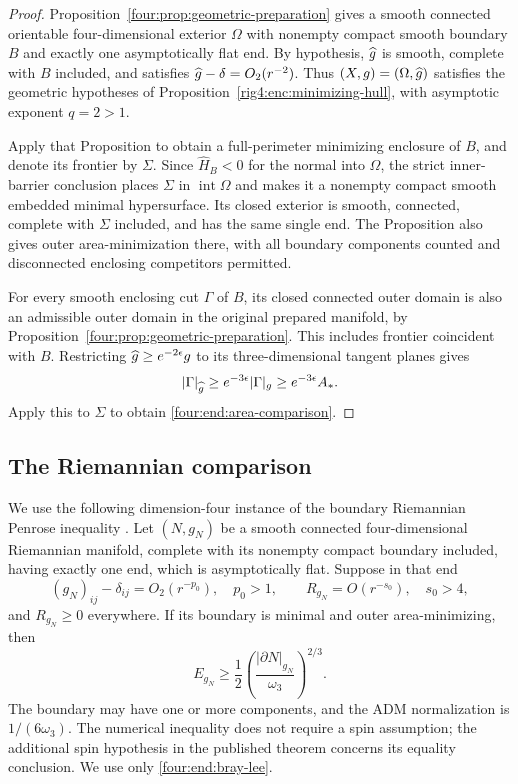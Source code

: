 \begin{proof}
Proposition~\ref{four:prop:geometric-preparation} gives a smooth connected
orientable four-dimensional exterior $\Omega$ with nonempty compact
smooth boundary $B$ and exactly one asymptotically flat end. By
hypothesis, $\widehat g$ is smooth, complete with $B$ included, and satisfies
$\widehat g-\delta=O_2(r^{-2})$. Thus $(X,g)=(\Omega,\widehat g)$ satisfies the
geometric hypotheses of Proposition~\ref{rig4:enc:minimizing-hull}, with
asymptotic exponent $q=2>1$.

Apply that Proposition to obtain a full-perimeter minimizing enclosure
of $B$, and denote its frontier by $\Sigma$. Since
$\widehat H_B<0$ for the normal into $\Omega$, the strict inner-barrier
conclusion places $\Sigma$ in $\operatorname{int}\Omega$ and makes it a
nonempty compact smooth embedded minimal hypersurface. Its closed
exterior is smooth, connected, complete with $\Sigma$ included, and
has the same single end. The Proposition also gives outer
area-minimization there, with all boundary components counted and
disconnected enclosing competitors permitted.

For every smooth enclosing cut $\Gamma$ of $B$, its closed connected
outer domain is also an admissible outer domain in the original
prepared manifold, by Proposition~\ref{four:prop:geometric-preparation}.
This includes frontier coincident with $B$. Restricting
$\widehat g\ge e^{-2\epsilon}g$ to its three-dimensional tangent planes gives
\begin{equation}\label{four:ex:cut-volume}
 |\Gamma|_{\widehat g}\ge e^{-3\epsilon}|\Gamma|_g\ge e^{-3\epsilon}A_*.
\end{equation}
Apply this to $\Sigma$ to obtain \eqref{four:end:area-comparison}.
\end{proof}

\subsection{The Riemannian comparison}

We use the following dimension-four instance of the boundary
Riemannian Penrose inequality
\cite[Theorem~1.4, p.~84]{BrayLee2009}.  Let $(N,g_N)$ be a smooth
connected four-dimensional Riemannian manifold, complete with its
nonempty compact boundary included, having exactly one end, which is
asymptotically flat. Suppose in that end
\[
 (g_N)_{ij}-\delta_{ij}=O_2(r^{-p_0}),\quad p_0>1,
 \qquad R_{g_N}=O(r^{-s_0}),\quad s_0>4,
\]
and $R_{g_N}\ge0$ everywhere.  If its boundary is minimal and outer
area-minimizing, then
\begin{equation}\label{four:end:bray-lee}
 E_{g_N}\ge\frac12
          \left(\frac{|\partial N|_{g_N}}{\omega_3}\right)^{2/3}.
\end{equation}
The boundary may have one or more components, and the ADM
normalization is $1/(6\omega_3)$.  The numerical inequality does not
require a spin assumption; the additional spin hypothesis in the
published theorem concerns its equality conclusion.  We use only
\eqref{four:end:bray-lee}.

